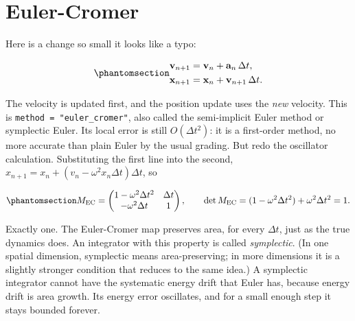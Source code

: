 \documentclass[
  10.5pt,
  letterpaper,
]{scrbook}
\theoremstyle{plain}
\theoremstyle{remark}
\begin{document}
\section{Euler-Cromer}\label{euler-cromer}

Here is a change so small it looks like a typo:

\begin{equation}\protect\phantomsection\label{eq-euler-cromer}{
\begin{aligned}
\mathbf{v}_{n+1} &= \mathbf{v}_n + \mathbf{a}_n\,\Delta t, \\
\mathbf{x}_{n+1} &= \mathbf{x}_n + \mathbf{v}_{n+1}\,\Delta t.
\end{aligned}
}\end{equation}

The velocity is updated first, and the position update uses the
\emph{new} velocity. This is \texttt{method\ =\ "euler\_cromer"}, also
called the semi-implicit Euler method or symplectic Euler. Its local
error is still \(O(\Delta t^2)\): it is a first-order method, no more
accurate than plain Euler by the usual grading. But redo the oscillator
calculation. Substituting the first line into the second,
\(x_{n+1} = x_n + (v_n - \omega^2 x_n \Delta t)\Delta t\), so

\begin{equation}\protect\phantomsection\label{eq-ec-matrix}{
M_{\mathrm{EC}} = \begin{pmatrix} 1 - \omega^2\Delta t^2 & \Delta t \\ -\omega^2\Delta t & 1 \end{pmatrix},
\qquad \det M_{\mathrm{EC}} = (1 - \omega^2\Delta t^2) + \omega^2\Delta t^2 = 1.
}\end{equation}

Exactly one. The Euler-Cromer map preserves area, for every
\(\Delta t\), just as the true dynamics does. An integrator with this
property is called \emph{symplectic}. (In one spatial dimension,
symplectic means area-preserving; in more dimensions it is a slightly
stronger condition that reduces to the same idea.) A symplectic
integrator cannot have the systematic energy drift that Euler has,
because energy drift is area growth. Its energy error oscillates, and
for a small enough step it stays bounded forever.
\end{document}
